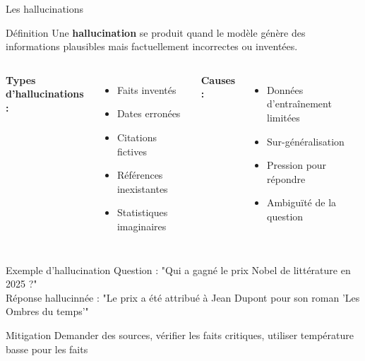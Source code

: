 \begin{frame}{Les hallucinations}
\begin{block}{Définition}
Une \textbf{hallucination} se produit quand le modèle génère des informations plausibles mais factuellement incorrectes ou inventées.
\end{block}

\vspace{0.3cm}

\begin{columns}
\textbf{Types d'hallucinations :}
\begin{itemize}
    \item Faits inventés
    \item Dates erronées
    \item Citations fictives
    \item Références inexistantes
    \item Statistiques imaginaires
\end{itemize}

\textbf{Causes :}
\begin{itemize}
    \item Données d'entraînement limitées
    \item Sur-généralisation
    \item Pression pour répondre
    \item Ambiguïté de la question
\end{itemize}
\end{columns}

\vspace{0.3cm}

\begin{alertblock}{Exemple d'hallucination}
Question : "Qui a gagné le prix Nobel de littérature en 2025 ?" \\
Réponse hallucinnée : "Le prix a été attribué à Jean Dupont pour son roman 'Les Ombres du temps'"
\end{alertblock}

\begin{exampleblock}{Mitigation}
Demander des sources, vérifier les faits critiques, utiliser température basse pour les faits
\end{exampleblock}
\end{frame}

